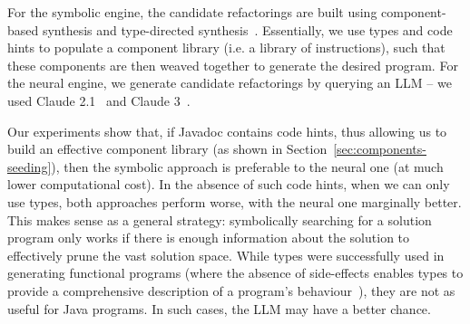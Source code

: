 \documentclass[sigconf,review,anonymous]{acmart}
\begin{document}
For the symbolic engine, the candidate refactorings are built using component-based synthesis\cite{DBLP:conf/icse/JhaGST10,DBLP:conf/pldi/GulwaniJTV11,DBLP:conf/popl/FengM0DR17}
and type-directed synthesis~\cite{DBLP:conf/sfp/Katayama05,DBLP:conf/pldi/OseraZ15,DBLP:journals/pacmpl/YamaguchiMDW21}. Essentially, we use types and code hints to populate
a component library (i.e. a library of instructions), such that these components are then weaved together to generate the desired program.
For the neural engine, we generate candidate refactorings by querying an LLM -- we used Claude 2.1~\cite{} and Claude 3~\cite{}.


Our experiments show that, if Javadoc contains code hints, thus allowing us to build an effective component library (as shown in Section~\ref{sec:components-seeding}), then the symbolic
approach is preferable to the neural one (at much lower computational cost). In the absence of such code hints, when we can only use types, both approaches perform worse, with the neural one
marginally better. This makes sense as a general strategy: symbolically searching for a solution program only works if there is enough information about
the solution to effectively prune the vast solution space. While types were successfully used in generating functional programs (where the absence of side-effects
enables types to provide a comprehensive description of a program's behaviour~\cite{DBLP:conf/sfp/Katayama05,DBLP:conf/pldi/OseraZ15,DBLP:journals/pacmpl/YamaguchiMDW21}),
they are not as useful for Java programs. In such cases, the LLM may have a better chance.





\end{document}
